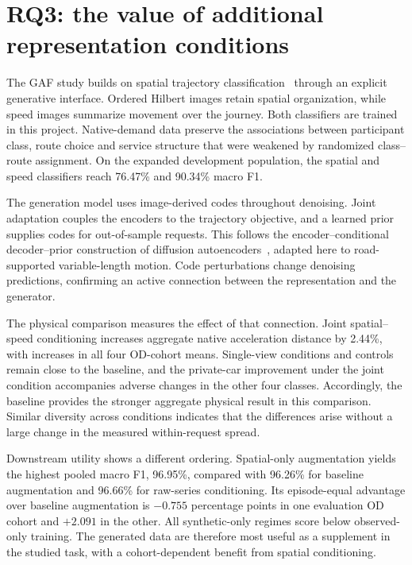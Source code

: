\section{RQ3: the value of additional representation conditions}
The GAF study builds on spatial trajectory classification~\cite{salvadori,ferreira,original} through an explicit generative interface. Ordered Hilbert images retain spatial organization, while speed images summarize movement over the journey. Both classifiers are trained in this project. Native-demand data preserve the associations between participant class, route choice and service structure that were weakened by randomized class--route assignment. On the expanded development population, the spatial and speed classifiers reach 76.47\% and 90.34\% macro F1.

The generation model uses image-derived codes throughout denoising. Joint adaptation couples the encoders to the trajectory objective, and a learned prior supplies codes for out-of-sample requests. This follows the encoder--conditional decoder--prior construction of diffusion autoencoders~\cite{diffae}, adapted here to road-supported variable-length motion. Code perturbations change denoising predictions, confirming an active connection between the representation and the generator.

The physical comparison measures the effect of that connection. Joint spatial--speed conditioning increases aggregate native acceleration distance by 2.44\%, with increases in all four OD-cohort means. Single-view conditions and controls remain close to the baseline, and the private-car improvement under the joint condition accompanies adverse changes in the other four classes. Accordingly, the baseline provides the stronger aggregate physical result in this comparison. Similar diversity across conditions indicates that the differences arise without a large change in the measured within-request spread.

Downstream utility shows a different ordering. Spatial-only augmentation yields the highest pooled macro F1, 96.95\%, compared with 96.26\% for baseline augmentation and 96.66\% for raw-series conditioning. Its episode-equal advantage over baseline augmentation is $-0.755$ percentage points in one evaluation OD cohort and $+2.091$ in the other. All synthetic-only regimes score below observed-only training. The generated data are therefore most useful as a supplement in the studied task, with a cohort-dependent benefit from spatial conditioning.

